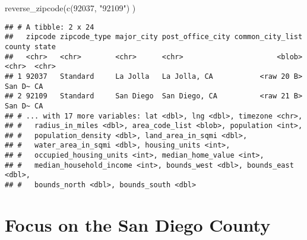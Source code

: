 \documentclass[
]{article}
\newenvironment{Shaded}{\begin{snugshade}}{\end{snugshade}}
\newcommand{\FunctionTok}[1]{\textcolor[rgb]{0.00,0.00,0.00}{#1}}
\newcommand{\NormalTok}[1]{#1}
\newcommand{\SpecialCharTok}[1]{\textcolor[rgb]{0.00,0.00,0.00}{#1}}
\newcommand{\StringTok}[1]{\textcolor[rgb]{0.31,0.60,0.02}{#1}}
\begin{document}
\begin{Shaded}
\begin{Highlighting}[]
\FunctionTok{reverse\_zipcode}\NormalTok{(}\FunctionTok{c}\NormalTok{(}\StringTok{\textquotesingle{}92037\textquotesingle{}}\NormalTok{, }\StringTok{"92109"}\NormalTok{) )}
\end{Highlighting}
\end{Shaded}

\begin{verbatim}
## # A tibble: 2 x 24
##   zipcode zipcode_type major_city post_office_city common_city_list county state
##   <chr>   <chr>        <chr>      <chr>                      <blob> <chr>  <chr>
## 1 92037   Standard     La Jolla   La Jolla, CA           <raw 20 B> San D~ CA   
## 2 92109   Standard     San Diego  San Diego, CA          <raw 21 B> San D~ CA   
## # ... with 17 more variables: lat <dbl>, lng <dbl>, timezone <chr>,
## #   radius_in_miles <dbl>, area_code_list <blob>, population <int>,
## #   population_density <dbl>, land_area_in_sqmi <dbl>,
## #   water_area_in_sqmi <dbl>, housing_units <int>,
## #   occupied_housing_units <int>, median_home_value <int>,
## #   median_household_income <int>, bounds_west <dbl>, bounds_east <dbl>,
## #   bounds_north <dbl>, bounds_south <dbl>
\end{verbatim}

\hypertarget{focus-on-the-san-diego-county}{%
\section{Focus on the San Diego
County}\label{focus-on-the-san-diego-county}}

\begin{Shaded}
\end{Shaded}
\end{document}

